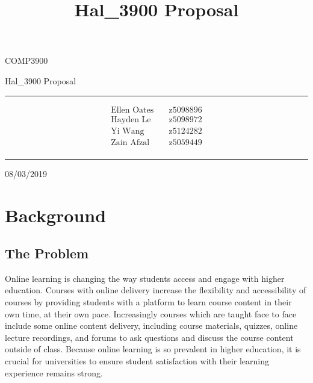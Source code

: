 \documentclass{article}
\title{Hal\_3900 Proposal}
\begin{document}
\begin{LARGE}
\begin{center}
\vspace*{15mm}

COMP3900

Hal\_3900 Proposal

\rule[4.5pt]{0.61\textwidth}{0.3pt}

\begin{align*}
  \text{Ellen Oates}    \quad   &\text{z5098896} \\
  \text{Hayden Le}      \quad   &\text{z5098972} \\
  \text{Yi Wang}        \quad   &\text{z5124282} \\
  \text{Zain Afzal}     \quad   &\text{z5059449} \\
\end{align*}

\rule[4.5pt]{0.61\textwidth}{0.3pt}

08/03/2019

\end{center}
\end{LARGE}
\newpage


\tableofcontents 
\newpage
 
\section{Background}

\subsection{The Problem}

Online learning is changing the way students access and engage with higher education. Courses with online delivery increase the flexibility and accessibility of courses by providing students with a platform to learn course content in their own time, at their own pace. Increasingly courses which are taught face to face include some online content delivery, including course materials, quizzes, online lecture recordings, and forums to ask questions and discuss the course content outside of class. Because online learning is so prevalent in higher education, it is crucial for universities to ensure student satisfaction with their learning experience remains strong. 
\end{document}
